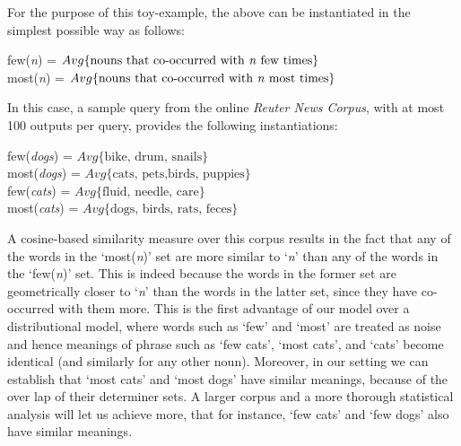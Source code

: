 For the purpose of this toy-example, the above can be instantiated in the simplest possible way as follows:
\begin{center}
few(\emph{n}) = $Avg\{\mbox{nouns that co-occurred with  \emph{n} few times}\}$\\
most(\emph{n}) = $Avg\{\mbox{nouns that co-occurred with \emph{n} most times}\}$
\end{center}
In this case, a sample query from the online  \emph{Reuter News Corpus}, with at most 100 outputs per query,  provides the following instantiations:
\begin{center}
few(\emph{dogs}) = $Avg\{\mbox{bike, drum, snails}\}$\\
most(\emph{dogs}) = $Avg\{\mbox{cats, pets,birds, puppies}\}$\\
few(\emph{cats}) = $Avg\{\mbox{fluid, needle, care}\}$\\
most(\emph{cats}) = $Avg\{\mbox{dogs, birds, rats, feces}\}$\\
\end{center}
A cosine-based similarity measure over this corpus results in the fact that any of the words in the `most(\emph{n})' set are   more similar to `\emph{n}' than any of  the  words in the `few(\emph{n})' set. This is indeed because  the words in the former set are geometrically closer to `\emph{n}' than the words in the latter set, since they have co-occurred with them more.  This is the first advantage of our model over  a distributional model, where words such as `few' and `most' are treated as  {noise} and hence meanings of phrase such as `few cats', `most cats', and `cats'  become  identical (and similarly for any other noun). Moreover, in our setting we can establish that `most cats' and `most dogs' have similar meanings, because of the over lap of their determiner sets. A larger corpus and a more thorough statistical analysis  will let us achieve more,  that for instance,   `few cats' and `few dogs' also have similar meanings. 

